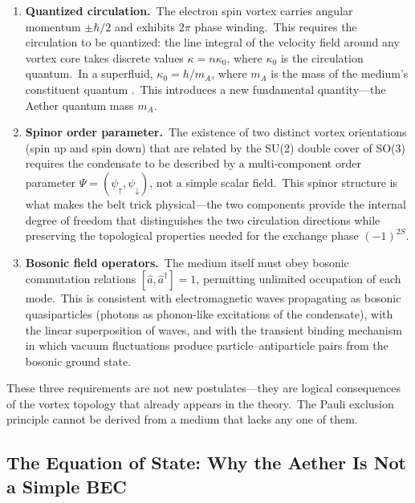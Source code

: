 ﻿\documentclass[12pt,letterpaper]{article}
\begin{document}
\begin{enumerate}[leftmargin=2em]
  \item \textbf{Quantized circulation.}\ The electron spin vortex carries angular
    momentum $\pm\hbar/2$ and exhibits $2\pi$ phase winding.\ This requires the
    circulation to be quantized: the line integral of the velocity field around
    any vortex core takes discrete values $\kappa = n\kappa_0$, where $\kappa_0$
    is the circulation quantum.\ In a superfluid, $\kappa_0 = h/m_A$, where $m_A$
    is the mass of the medium's constituent quantum \cite{donnelly1991}.\ This introduces a
    new fundamental quantity---the Aether quantum mass $m_A$.

  \item \textbf{Spinor order parameter.}\ The existence of two distinct vortex
    orientations (spin up and spin down) that are related by the SU(2) double
    cover of SO(3) requires the condensate to be described by a multi-component
    order parameter $\Psi = (\psi_\uparrow, \psi_\downarrow)$, not a simple
    scalar field.\ This spinor structure is what makes the belt trick
    physical---the two components provide the internal degree of freedom that
    distinguishes the two circulation directions while preserving the topological
    properties needed for the exchange phase $(-1)^{2S}$.

  \item \textbf{Bosonic field operators.}\ The medium itself must obey bosonic
    commutation relations $[\hat{a}, \hat{a}^\dagger] = 1$, permitting unlimited
    occupation of each mode.\ This is consistent with electromagnetic waves
    propagating as bosonic quasiparticles (photons as phonon-like excitations of
    the condensate), with the linear superposition of waves, and with the
    transient binding mechanism in which vacuum fluctuations produce
    particle--antiparticle pairs from the bosonic ground state.
\end{enumerate}

These three requirements are not new postulates---they are logical consequences
of the vortex topology that already appears in the theory.\ The Pauli exclusion
principle cannot be derived from a medium that lacks any one of them.


\subsection{The Equation of State: Why the Aether Is Not a Simple BEC}
\end{document}
